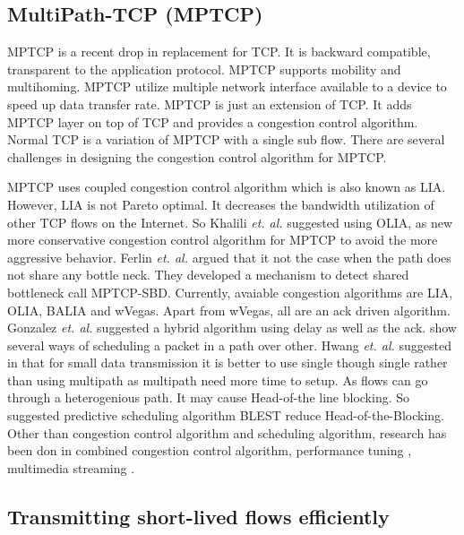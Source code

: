 \subsection{MultiPath-TCP (MPTCP)}
MPTCP\cite{scharf2013multipath} is a recent drop in replacement for TCP. It is backward compatible, transparent to the application protocol. MPTCP supports mobility and multihoming. MPTCP utilize multiple network interface available to a device to speed up data transfer rate. MPTCP is just an extension of TCP\cite{mptcpsurvey}. It adds MPTCP layer on top of TCP and provides a congestion control algorithm. Normal TCP is a variation of MPTCP with a single sub flow. There are several challenges in designing the congestion control algorithm for MPTCP. 

MPTCP uses coupled congestion control algorithm which is also known as LIA\cite{LIARFC6356}. However, LIA is not Pareto optimal\cite{OLIARamin2012}. It decreases the bandwidth utilization of other TCP flows on the Internet. So Khalili \textit{et. al.} suggested using OLIA, as new more conservative congestion control algorithm for MPTCP to avoid the more aggressive behavior. Ferlin \textit{et. al.} argued that it not the case when the path does not share any bottle neck\cite{MPTCP-SBD}. They developed a mechanism to detect shared bottleneck call MPTCP-SBD.
Currently, avaiable congestion algorithms are LIA, OLIA, BALIA and wVegas\cite{wVegas}. Apart from wVegas, all are an ack driven algorithm. Gonzalez \textit{et. al.} suggested a hybrid algorithm\cite{Balia-wvegas} using delay as well as the ack. \cite{aschedulermptcp,blestschedular,scheadulerformptcp} show several ways of scheduling a packet in a path over other. Hwang \textit{et. al.} suggested in \cite{scheadulerformptcp} that for small data transmission it is better to use single though single rather than using multipath as multipath need more time to setup. As flows can go through a heterogenious path. It may cause Head-of-the line blocking. So \cite{blestschedular} suggested predictive scheduling algorithm BLEST reduce Head-of-the-Blocking. Other than congestion control algorithm and scheduling algorithm, research has been don in combined congestion control algorithm\cite{outofordermptcp}, performance tuning \cite{optimization}, multimedia streaming \cite{streaming}.


\subsection{Transmitting short-lived flows efficiently}

